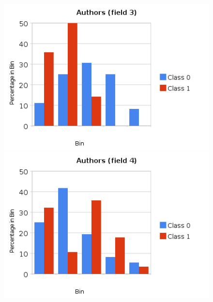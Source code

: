 \documentclass[a4paper,10pt]{article}
\begin{document}
        \begin{figure}[ht!]
          \begin{minipage}[b]{0.5\linewidth}
            \includegraphics[scale=0.45]{charts/AuthorsPics/A3.png}
          \end{minipage}
          \begin{minipage}[b]{0.5\linewidth}
             \includegraphics[scale=0.45]{charts/AuthorsPics/A4.png}
          \end{minipage}
        \end{figure}
\end{document}
